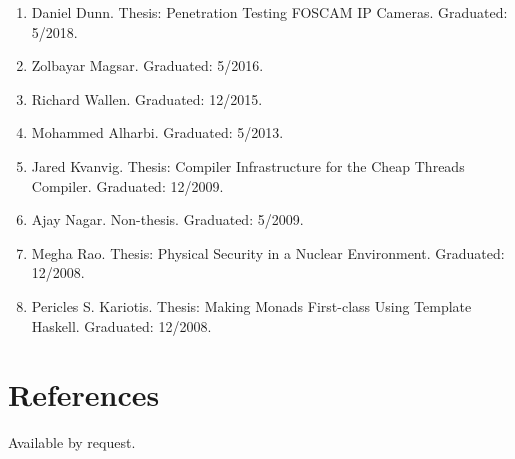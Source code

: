 \documentclass[12pt]{article} %
\begin{document}
\begin{enumerate}[leftmargin=0.0mm]
\item Daniel Dunn. Thesis: Penetration Testing FOSCAM IP Cameras. Graduated: 5/2018.
\item Zolbayar Magsar. Graduated: 5/2016.
\item Richard Wallen. Graduated: 12/2015.
\item Mohammed Alharbi. Graduated: 5/2013.
\item Jared Kvanvig. Thesis: Compiler Infrastructure for the Cheap Threads Compiler. Graduated: 12/2009.
\item Ajay Nagar.  Non-thesis. Graduated: 5/2009.
\item Megha Rao. Thesis: Physical Security in a Nuclear Environment. Graduated: 12/2008.
\item Pericles S. Kariotis. Thesis: Making Monads First-class Using Template Haskell. Graduated: 12/2008.
\end{enumerate}


\section*{References}
\vspace{1ex}

Available by request.
\end{document}
